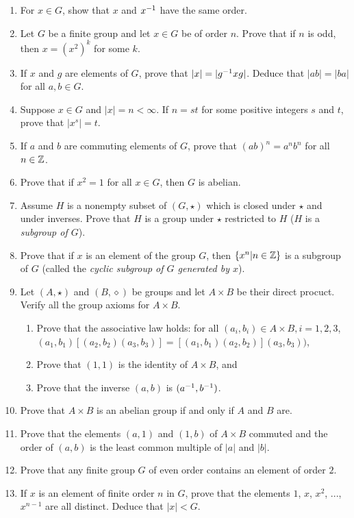 \begin{enumerate}
		\item For $x\in G$, show that $x$ and $x^{-1}$ have the same order.
		\item Let $G$ be a finite group and let $x\in G$ be of order $n$.  Prove that if $n$ is odd, then $x = (x^2)^k$ for some $k$.
		\item If $x$ and $g$ are elements of $G$, prove that $|x|=|g^{-1} xg|$.  Deduce that $|ab| = |ba|$ for all $a,b\in G$.
		\item Suppose $x\in G$ and $|x| = n<\infty$.  If $n=st$ for some positive integers $s$ and $t$, prove that $|x^s| = t$.
		\item If $a$ and $b$ are commuting elements of $G$, prove that $(ab)^n = a^nb^n$ for all $n\in \mathbb{Z}$.
		\item Prove that if $x^2 = 1$ for all $x\in G$, then $G$ is abelian.
		\item Assume $H$ is a nonempty subset of $(G,\star)$ which is closed under $\star$ and under inverses.  Prove that $H$ is a group under $\star$ restricted to $H$ ($H$ is a \emph{subgroup of $G$}).
		\item Prove that if $x$ is an element of the group $G$, then $\left\{ x^n|n\in\mathbb{Z} \right\}$ is a subgroup of $G$ (called the \emph{cyclic subgroup of $G$ generated by $x$}).
		\item Let $(A,\star)$ and $(B,\diamond)$ be groups and let $A\times B$ be their direct procuct.  Verify all the group axioms for $A\times B$.
		\begin{enumerate}
			\item Prove that the associative law holds: for all $(a_i,b_i)\in A\times B, i = 1,2,3$, \\$(a_1,b_1)[(a_2,b_2)(a_3,b_3)] = [(a_1,b_1)(a_2,b_2)](a_3,b_3))$,
			\item Prove that $(1,1)$ is the identity of $A\times B$, and
			\item Prove that the inverse $(a,b)$ is $(a^{-1},b^{-1})$.
		\end{enumerate}
		\item Prove that $A\times B$ is an abelian group if and only if $A$ and $B$ are.
		\item Prove that the elements $(a,1)$ and $(1,b)$ of $A\times B$ commuted and the order of $(a,b)$ is the least common multiple of $|a|$ and $|b|$.
		\item Prove that any finite group $G$ of even order contains an element of order $2$.
		\item If $x$ is an element of finite order $n$ in $G$, prove that the elements $1$, $x$, $x^2$, ..., $x^{n-1}$ are all distinct.  Deduce that $|x|<G$.

\end{enumerate}
